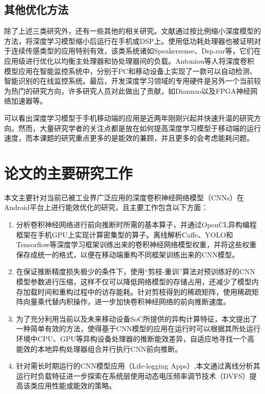 \subsection{其他优化方法}
除了上述三类研究外，还有一些其他的相关研究。文献\cite{lane2015deepear,chen2014small,variani2014deep}通过按比例缩小深度模型的方法，将深度学习模型缩小后运行在手机或DSP上。使用低功耗处理器也被证明对于连续传感类型的应用特别有效，该类系统诸如Speakersense\cite{lu2011speakersense}、Dsp.ear\cite{georgiev2014dsp}等，它们在应用级进行优化以均衡主处理器和协处理器间的负载。Antoniou等人\cite{antoniou2016general}将深度卷积模型应用在智能监控系统中，分别于PC和移动设备上实现了一款可以自动检测、智能识别的在线监控系统。最后，开发深度学习领域的专用硬件是另外一个当前较为热门的研究方向，许多研究人员对此做出了贡献，如Diannao\cite{chen2014diannao}以及FPGA神经网络加速器\cite{zhang2015optimizing,wang2017dlau,yu2015deep,wang2016solar}等。

可以看出深度学习模型于手机移动端的应用是近两年刚刚兴起并快速升温的研究方向。然而，大量研究学者的关注点都是放在如何提高深度学习模型于移动端的运行速度，而本课题的研究重点更多的是能效的兼顾，并且更多的会考虑能耗问题。

\section{论文的主要研究工作}
本文主要针对当前已被工业界广泛应用的深度卷积神经网络模型（CNNs）在Android平台上进行能效优化的研究，且主要工作包含以下方面：
\begin{enumerate}
\item 分析卷积神经网络进行前向推断时所需的基本算子，并通过OpenCL异构编程框架在手机GPU上实现计算密集型的算子。离线解析Caffe、YOLO\cite{redmon2016you}和Tensorflow\cite{abadi2016tensorflow}等深度学习框架训练出来的卷积神经网络模型权重，并将这些权重保存成统一的格式，以便在移动端重构不同框架训练出来的CNN模型。
\item 在保证推断精度损失极少的条件下，使用“剪枝-重训”算法对预训练好的CNN模型参数进行压缩，这样不仅可以降低网络模型的存储占用，还减少了模型内存加载时间和重构过程中的访存能耗。针对剪枝得到的稀疏矩阵，使用稀疏矩阵向量乘代替内积操作，进一步加快卷积神经网络的前向推断速度。
\item 为了充分利用当前以及未来移动设备SoC所提供的异构计算特征，本文提出了一种简单有效的方法，使得基于CNN模型的应用在运行时可以根据其所处运行环境中CPU、GPU等异构设备处理器的推断能效差异，自适应地寻找一个高能效的本地异构处理器组合并行执行CNN前向推断。
\item 针对需长时期运行的CNN模型应用（Life-logging Apps）,本文通过离线分析其运行时负载特征进一步探索在系统层使用动态电压频率调节技术（DVFS）\cite{le2010dynamic}提高该类应用性能或能效的策略。
\end{enumerate}

